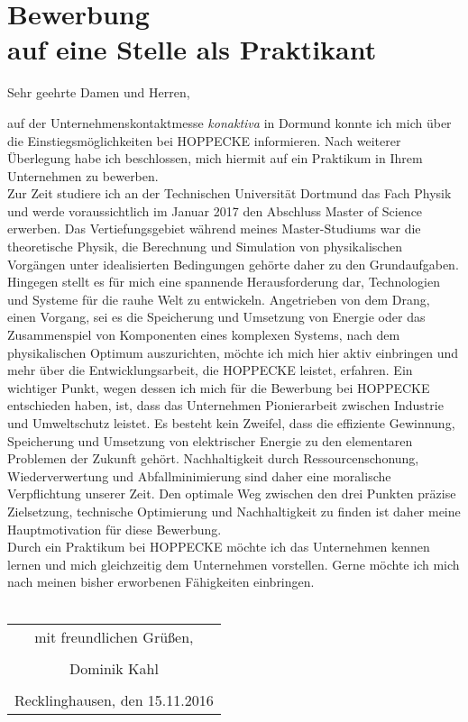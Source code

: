 \documentclass{scrartcl}
\begin{document}
\pagestyle{empty}

\section*{Bewerbung \\
auf eine Stelle als Praktikant}

\vspace{0.5in}

Sehr geehrte Damen und Herren,
\newline

auf der Unternehmenskontaktmesse \textit{konaktiva} in Dormund konnte 
ich mich über die Einstiegsmöglichkeiten bei HOPPECKE informieren. Nach 
weiterer Überlegung habe ich beschlossen, mich hiermit auf ein 
Praktikum in Ihrem Unternehmen zu bewerben.
\\

Zur Zeit studiere ich an der Technischen Universität Dortmund das Fach Physik 
und werde voraussichtlich im Januar 2017 den Abschluss Master of Science 
erwerben. Das Vertiefungsgebiet während meines Master-Studiums war die 
theoretische Physik, die Berechnung und Simulation von physikalischen Vorgängen 
unter idealisierten Bedingungen gehörte daher zu den Grundaufgaben. 
Hingegen stellt es für mich eine spannende Herausforderung dar, Technologien 
und Systeme für die {\glqq rauhe\grqq} Welt zu entwickeln. Angetrieben von dem 
Drang, einen Vorgang, sei es die Speicherung und Umsetzung von 
Energie oder das Zusammenspiel von Komponenten eines komplexen Systems, nach 
dem physikalischen Optimum auszurichten, möchte ich mich hier aktiv einbringen 
und mehr über die Entwicklungsarbeit, die HOPPECKE leistet, erfahren. 
Ein wichtiger Punkt, wegen dessen ich mich für die Bewerbung bei HOPPECKE 
entschieden haben, ist, dass das Unternehmen Pionierarbeit zwischen 
Industrie und Umweltschutz leistet. Es besteht kein Zweifel, dass 
die effiziente Gewinnung, Speicherung und Umsetzung von elektrischer Energie 
zu den elementaren Problemen der Zukunft gehört. Nachhaltigkeit durch 
Ressourcenschonung, Wiederverwertung und Abfallminimierung sind daher 
eine moralische Verpflichtung unserer Zeit.
Den optimale Weg zwischen den drei Punkten präzise Zielsetzung, technische 
Optimierung und Nachhaltigkeit zu finden ist daher meine Hauptmotivation für 
diese Bewerbung.
\\

Durch ein Praktikum bei HOPPECKE möchte ich das Unternehmen kennen lernen 
und mich gleichzeitig dem Unternehmen vorstellen. Gerne möchte ich mich 
nach meinen bisher erworbenen Fähigkeiten einbringen.
\\\\


\begin{flushright}
\begin{tabular}{c}
mit freundlichen Grüßen, \\ \\
Dominik Kahl \\ \\
Recklinghausen, den 15.11.2016 \\
\end{tabular}
\end{flushright}
\end{document}
